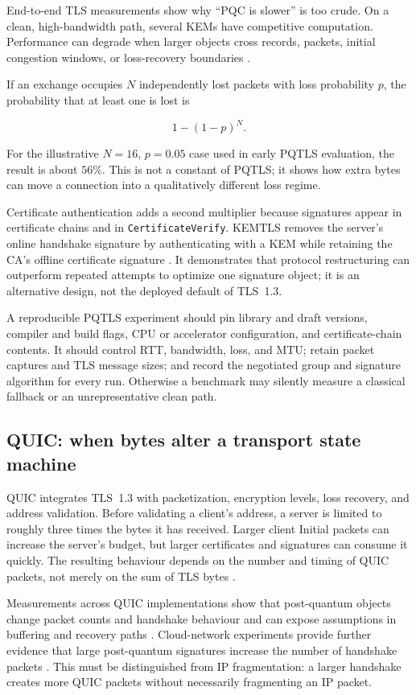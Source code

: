 End-to-end TLS measurements show why ``PQC is slower'' is too crude. On a clean,
high-bandwidth path, several KEMs have competitive computation. Performance can
degrade when larger objects cross records, packets, initial congestion windows, or
loss-recovery boundaries \cite{pqtlsperformance2023,pqtlspqcrypto2020}.

If an exchange occupies $N$ independently lost packets with loss probability $p$,
the probability that at least one is lost is

\[
  1-(1-p)^N.
\]

For the illustrative $N=16$, $p=0.05$ case used in early PQTLS evaluation, the
result is about $56\%$. This is not a constant of PQTLS; it shows how extra bytes
can move a connection into a qualitatively different loss regime.

Certificate authentication adds a second multiplier because signatures appear in
certificate chains and in \texttt{CertificateVerify}. KEMTLS removes the server's
online handshake signature by authenticating with a KEM while retaining the CA's
offline certificate signature \cite{kemtls2020}. It demonstrates that protocol
restructuring can outperform repeated attempts to optimize one signature object;
it is an alternative design, not the deployed default of TLS~1.3.

A reproducible PQTLS experiment should pin library and draft versions, compiler and
build flags, CPU or accelerator configuration, and certificate-chain contents. It
should control RTT, bandwidth, loss, and MTU; retain packet captures and TLS message
sizes; and record the negotiated group and signature algorithm for every run.
Otherwise a benchmark may silently measure a classical fallback or an
unrepresentative clean path.

\subsection{QUIC: when bytes alter a transport state machine}

QUIC integrates TLS~1.3 with packetization, encryption levels, loss recovery, and
address validation. Before validating a client's address, a server is limited to
roughly three times the bytes it has received. Larger client Initial packets can
increase the server's budget, but larger certificates and signatures can consume it
quickly. The resulting behaviour depends on the number and timing of QUIC packets,
not merely on the sum of TLS bytes \cite{rfc9000}.

Measurements across QUIC implementations show that post-quantum objects change
packet counts and handshake behaviour and can expose assumptions in buffering and
recovery paths \cite{quantumquic2024}. Cloud-network experiments provide further
evidence that large post-quantum signatures increase the number of handshake packets
\cite{pqquiccloud2023}. This must be distinguished from IP fragmentation: a larger
handshake creates more QUIC packets without necessarily fragmenting an IP packet.

